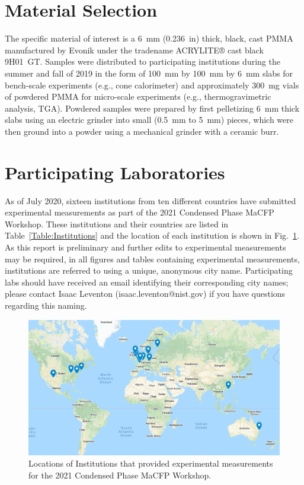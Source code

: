 \documentclass{book}
\begin{document}
\section{Material Selection}

The specific material of interest is a 6~mm (0.236~in) thick, black, cast PMMA manufactured by Evonik under the tradename ACRYLITE® cast black 9H01~GT. Samples were distributed to participating institutions during the summer and fall of 2019 in the form of 100~mm by 100~mm by 6~mm slabs for bench-scale experiments (e.g., cone calorimeter) and approximately 300~mg vials of powdered PMMA for micro-scale experiments (e.g., thermogravimetric analysis, TGA). Powdered samples were prepared by first pelletizing 6~mm thick slabs using an electric grinder into small (0.5~mm to 5~mm) pieces, which were then ground into a powder using a mechanical grinder with a ceramic burr.

\section{Participating Laboratories}

As of July 2020, sixteen institutions from ten different countries have submitted experimental measurements as part of the 2021 Condensed Phase MaCFP Workshop. These institutions and their countries are listed in Table~\ref{Table:Institutions} and the location of each institution is shown in Fig.~\ref{Fig:MaCFP_Map_20200831}. As this report is preliminary and further edits to experimental measurements may be required, in all figures and tables containing experimental measurements, institutions are referred to using a unique, anonymous city name. Participating labs should have received an email identifying their corresponding city names; please contact Isaac Leventon (isaac.leventon@nist.gov) if you have questions regarding this naming.

\begin{figure}[h]
  \centering
  \includegraphics[width=6in]{FIGURES/MaCFP_Map}
  \caption{Locations of Institutions that provided experimental measurements for the 2021 Condensed Phase MaCFP Workshop.}
  \label{Fig:MaCFP_Map_20200831}
\end{figure}
\end{document}
